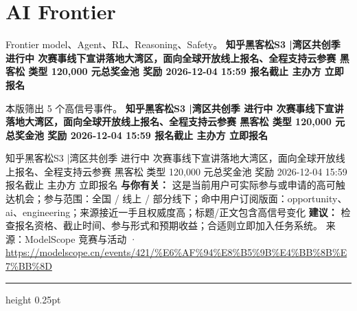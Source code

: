 \documentclass[10.5pt]{ctexart}
\begin{document}
\section*{AI Frontier}
{\color{ormuted} Frontier model、Agent、RL、Reasoning、Safety。}
\vspace{2mm}
{\LARGE\bfseries 知乎黑客松S3 |湾区共创季 进行中 次赛事线下宣讲落地大湾区，面向全球开放线上报名、全程支持云参赛 黑客松 类型 120,000 元总奖金池 奖励 2026-12-04 15:59 报名截止 主办方 立即报名}\par
\vspace{1mm}
{\color{ormuted} 本版筛出 5 个高信号事件。}
\vspace{3mm}
{\Large\bfseries 知乎黑客松S3 |湾区共创季 进行中 次赛事线下宣讲落地大湾区，面向全球开放线上报名、全程支持云参赛 黑客松 类型 120,000 元总奖金池 奖励 2026-12-04 15:59 报名截止 主办方 立即报名}\par
知乎黑客松S3 |湾区共创季 进行中 次赛事线下宣讲落地大湾区，面向全球开放线上报名、全程支持云参赛 黑客松 类型 120,000 元总奖金池 奖励 2026-12-04 15:59 报名截止 主办方 立即报名
\textbf{与你有关：} 这是当前用户可实际参与或申请的高可触达机会；参与范围：全国 / 线上 / 部分线下；命中用户订阅版面：opportunity、ai、engineering；来源接近一手且权威度高；标题/正文包含高信号变化
\textbf{建议：} 检查报名资格、截止时间、参与形式和预期收益；合适则立即加入任务系统。
{\footnotesize\color{ormuted} 来源：ModelScope 竞赛与活动 · \url{https://modelscope.cn/events/421/%E6%AF%94%E8%B5%9B%E4%BB%8B%E7%BB%8D}}
\vspace{4mm}
\hrule height 0.25pt
\vspace{3mm}
\end{document}

